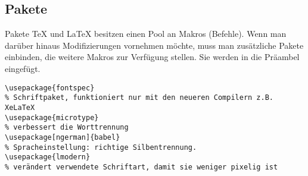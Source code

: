 \subsection{Pakete}
\begin{frame}[fragile]{Pakete}
\TeX{} und \LaTeX{} besitzen einen Pool an Makros (Befehle). Wenn man darüber hinaus Modifizierungen vornehmen möchte, muss man zusätzliche Pakete einbinden, die weitere Makros zur Verfügung stellen. Sie werden in die Präambel eingefügt. %

\begin{lstlisting}[style=tex]
\usepackage{fontspec}
% Schriftpaket, funktioniert nur mit den neueren Compilern z.B. XeLaTeX
\usepackage{microtype}
% verbessert die Worttrennung
\usepackage[ngerman]{babel}
% Spracheinstellung: richtige Silbentrennung.
\usepackage{lmodern}
% verändert verwendete Schriftart, damit sie weniger pixelig ist
\end{lstlisting}
\end{frame}

